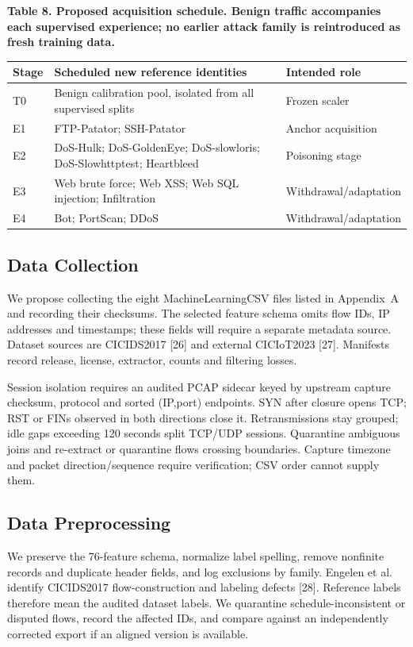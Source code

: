 \documentclass[10pt,a4paper]{article}
\begin{document}
\centering\footnotesize
\par\textbf{Table 8. Proposed acquisition schedule. Benign traffic accompanies each supervised experience; no earlier attack family is reintroduced as fresh training data.}\par


\begin{longtable}{p{1.0cm}l p{2.2cm}}
\toprule
Stage & Scheduled new reference identities & Intended role\\
\midrule
T0 & Benign calibration pool, isolated from all supervised splits & Frozen scaler\\
E1 & FTP-Patator; SSH-Patator & Anchor acquisition\\
E2 & DoS-Hulk; DoS-GoldenEye; DoS-slowloris; DoS-Slowhttptest; Heartbleed & Poisoning stage\\
E3 & Web brute force; Web XSS; Web SQL injection; Infiltration & Withdrawal/adaptation\\
E4 & Bot; PortScan; DDoS & Withdrawal/adaptation\\
\bottomrule
\end{longtable}


\subsection{Data Collection}
We propose collecting the eight MachineLearningCSV files listed in Appendix~A and recording their checksums. The selected feature schema omits flow IDs, IP addresses and timestamps; these fields will require a separate metadata source. Dataset sources are CICIDS2017 [26] and external CICIoT2023 [27]. Manifests record release, license, extractor, counts and filtering losses.

Session isolation requires an audited PCAP sidecar keyed by upstream capture checksum, protocol and sorted (IP,port) endpoints. SYN after closure opens TCP; RST or FINs observed in both directions close it. Retransmissions stay grouped; idle gaps exceeding 120 seconds split TCP/UDP sessions. Quarantine ambiguous joins and re-extract or quarantine flows crossing boundaries. Capture timezone and packet direction/sequence require verification; CSV order cannot supply them.

\subsection{Data Preprocessing}
We preserve the 76-feature schema, normalize label spelling, remove nonfinite records and duplicate header fields, and log exclusions by family. Engelen et al. identify CICIDS2017 flow-construction and labeling defects [28]. Reference labels therefore mean the audited dataset labels. We quarantine schedule-inconsistent or disputed flows, record the affected IDs, and compare against an independently corrected export if an aligned version is available.
\end{document}
